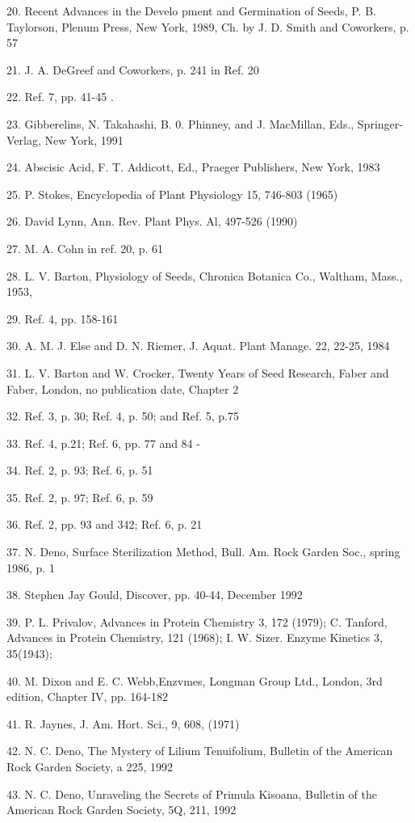 20. Recent Advances in the Develo pment and Germination of Seeds, P. B. Taylorson,
Plenum Press, New York, 1989, Ch. by J. D. Smith and Coworkers, p. 57

21. J. A. DeGreef and Coworkers, p. 241 in Ref. 20

22. Ref. 7, pp. 41-45 .

23. Gibberelins, N. Takahashi, B. 0. Phinney, and J. MacMillan, Eds., Springer-
Verlag, New York, 1991

24. Abscisic Acid, F. T. Addicott, Ed., Praeger Publishers, New York, 1983

25. P. Stokes, Encyclopedia of Plant Physiology 15, 746-803 (1965)

26. David Lynn, Ann. Rev. Plant Phys. Al, 497-526 (1990)

27. M. A. Cohn in ref. 20, p. 61

28. L. V. Barton, Physiology of Seeds, Chronica Botanica Co., Waltham, Mass.,
1953,

29. Ref. 4, pp. 158-161

30. A. M. J. Else and D. N. Riemer, J. Aquat. Plant Manage. 22, 22-25, 1984

31. L. V. Barton and W. Crocker, Twenty Years of Seed Research, Faber and Faber,
London, no publication date, Chapter 2

32. Ref. 3, p. 30; Ref. 4, p. 50; and Ref. 5, p.75

33. Ref. 4, p.21; Ref. 6, pp. 77 and 84 -

34. Ref. 2, p. 93; Ref. 6, p. 51

35. Ref. 2, p. 97; Ref. 6, p. 59

36. Ref. 2, pp. 93 and 342; Ref. 6, p. 21

37. N. Deno, Surface Sterilization Method, Bull. Am. Rock Garden Soc., spring
1986, p. 1

38. Stephen Jay Gould, Discover, pp. 40-44, December 1992

39. P. L. Privalov, Advances in Protein Chemistry 3, 172 (1979); C. Tanford,
Advances in Protein Chemistry, 121 (1968); I. W. Sizer. Enzyme
Kinetics 3, 35(1943);

40. M. Dixon and E. C. Webb,Enzvmes, Longman Group Ltd., London, 3rd edition,
Chapter IV, pp. 164-182

41. R. Jaynes, J. Am. Hort. Sci., 9, 608, (1971)

42. N. C. Deno, The Mystery of Lilium Tenuifolium, Bulletin of the American Rock
Garden Society, a 225, 1992

43. N. C. Deno, Unraveling the Secrets of Primula Kisoana, Bulletin of the American
Rock Garden Society, 5Q, 211, 1992

